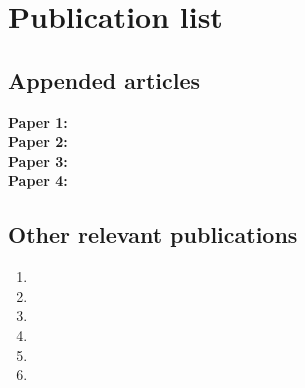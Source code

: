 
\nobibliography*

\clearpage

\chapter*{Publication list}

\section*{Appended articles}
\begin{description}
\item[\textbf{Paper 1:}] 
\item[\textbf{Paper 2:}] 
\item[\textbf{Paper 3:}] 
\item[\textbf{Paper 4:}] 
\end{description}

\section*{Other relevant publications}

\begin{enumerate}
\item {}
\item {}
\item {}
\item {}
\item {}
\item {}
\end{enumerate}
